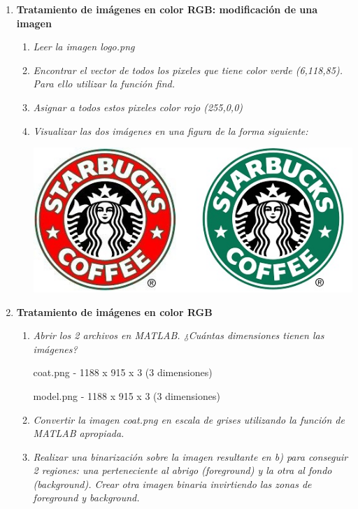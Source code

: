 \documentclass[a4paper,10pt]{article}
\begin{document}
\begin{enumerate}
\begin{enumerate}
 \end{enumerate}

\newpage

 \item \textbf{Tratamiento de imágenes en color RGB: modificación de una imagen}
 
 \begin{enumerate}
 \item \textit{Leer la imagen logo.png}
 \item \textit{Encontrar el vector de todos los pixeles que tiene color verde (6,118,85). Para 
ello utilizar la función find.}
 \item \textit{Asignar a todos estos pixeles color rojo (255,0,0)}
 \item \textit{Visualizar las dos imágenes en una figura de la forma siguiente:}
 
 \begin{center} 
 \includegraphics[scale=0.5]{subplot_7}
 \end{center}
 
 \end{enumerate}

\newpage

 \item \textbf{Tratamiento de imágenes en color RGB}
 
 \begin{enumerate}
 \item \textit{Abrir los 2 archivos en MATLAB. ¿Cuántas dimensiones tienen las 
imágenes?}

 coat.png - 1188 x 915 x 3 (3 dimensiones)
 
 model.png - 1188 x 915 x 3 (3 dimensiones)
 
 \item \textit{Convertir la imagen coat.png en escala de grises utilizando la función de 
MATLAB apropiada.}

 \item \textit{Realizar una binarización sobre la imagen resultante en b) para conseguir 
2 regiones: una perteneciente al abrigo (foreground) y la otra al fondo 
(background). Crear otra imagen binaria invirtiendo las zonas de 
foreground y background.}


\end{enumerate}
\end{enumerate}
\end{document}
